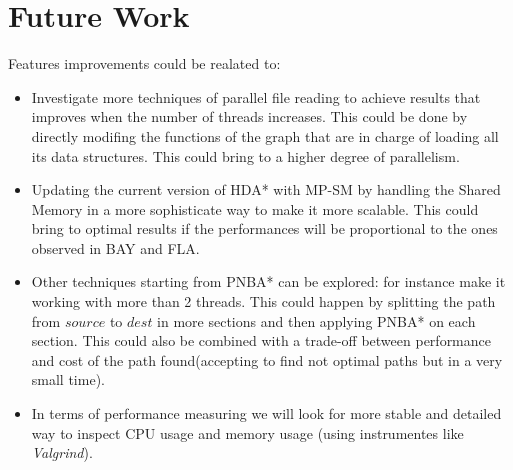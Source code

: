 \documentclass[twocolumn, switch]{article} %
\begin{document}
\section{Future Work}
Features improvements could be realated to:
\begin{itemize}
  \item Investigate more techniques of parallel file reading to achieve results that improves when the 
        number of threads increases. This could be done by directly modifing the functions of the graph 
        that are in charge of loading all its data structures. This could bring to a higher degree of
        parallelism.
  \item Updating the current version of HDA* with MP-SM by handling the Shared Memory in a more sophisticate
        way to make it more scalable. This could bring to optimal results if the performances 
        will be proportional to the ones observed in BAY and FLA.
  \item Other techniques starting from PNBA* can be explored: for instance make it working with more than 2
        threads. This could happen by splitting the path from $source$ to $dest$ in more sections and then
        applying PNBA* on each section. This could also be combined with a trade-off between performance and
        cost of the path found(accepting to find not optimal paths but in a very small time).
  \item In terms of performance measuring we will look for more stable and detailed way to inspect CPU usage
        and memory usage (using instrumentes like \textit{Valgrind}).
\end{itemize}
\end{document}
